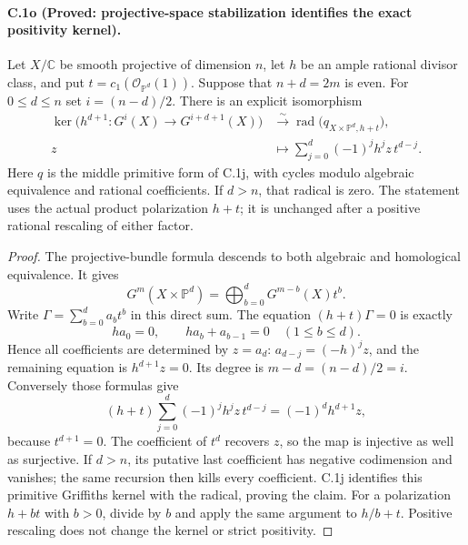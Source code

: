 \paragraph{C.1o (Proved: projective-space stabilization identifies the exact positivity kernel).}
Let $X/\mathbb C$ be smooth projective of dimension $n$, let $h$ be an
ample rational divisor class, and put $t=c_1(\mathcal O_{\mathbb P^d}(1))$.
Suppose that $n+d=2m$ is even. For $0\le d\le n$ set
$i=(n-d)/2$. There is an explicit isomorphism
\begin{equation}\label{eq:C1o-radical}
 \begin{split}
 \ker\bigl(h^{d+1}:G^i(X)\longrightarrow G^{i+d+1}(X)\bigr)
 &\xrightarrow{\ \sim\ }
 \operatorname{rad}\bigl(q_{X\times\mathbb P^d,h+t}\bigr),\\
 z&\longmapsto
 \sum_{j=0}^{d}(-1)^j h^jz\,t^{d-j}.
 \end{split}
\end{equation}
Here $q$ is the middle primitive form of C.1j, with cycles modulo
algebraic equivalence and rational coefficients. If $d>n$, that radical
is zero. The statement uses the actual product polarization $h+t$;
it is unchanged after a positive rational rescaling of either factor.

\begin{proof}
The projective-bundle formula descends to both algebraic and
homological equivalence. It gives
\[
 G^m(X\times\mathbb P^d)=
       \bigoplus_{b=0}^{d}G^{m-b}(X)t^b.
\]
Write $\Gamma=\sum_{b=0}^d a_bt^b$ in this direct sum.
The equation $(h+t)\Gamma=0$ is exactly
\[
 ha_0=0,\qquad ha_b+a_{b-1}=0\quad(1\le b\le d).
\]
Hence all coefficients are determined by $z=a_d$:
$a_{d-j}=(-h)^jz$, and the remaining equation is $h^{d+1}z=0$.
Its degree is $m-d=(n-d)/2=i$. Conversely those formulas give
\[
 (h+t)\sum_{j=0}^{d}(-1)^j h^jz\,t^{d-j}
                         =(-1)^d h^{d+1}z,
\]
because $t^{d+1}=0$. The coefficient of $t^d$ recovers $z$, so
the map is injective as well as surjective. If $d>n$, its putative
last coefficient has negative codimension and vanishes; the same
recursion then kills every coefficient. C.1j identifies this primitive
Griffiths kernel with the radical, proving the claim. For a polarization
$h+bt$ with $b>0$, divide by $b$ and apply the same argument to
$h/b+t$. Positive rescaling does not change the kernel or strict
positivity.
\end{proof}


